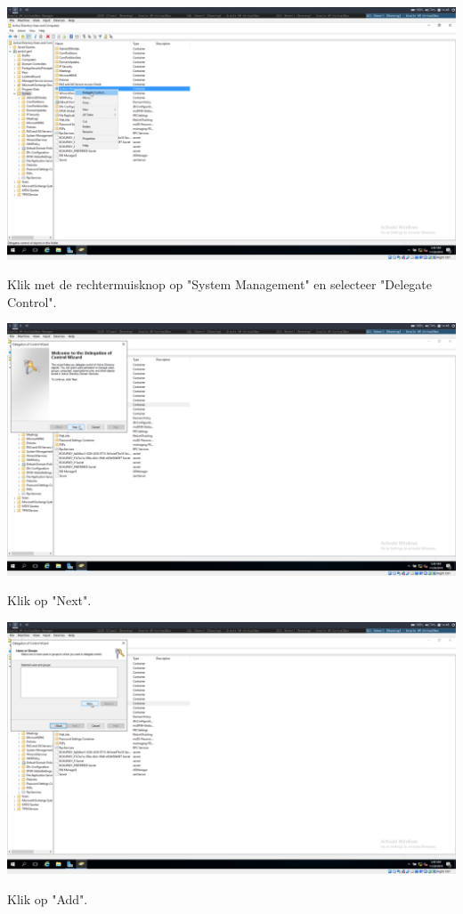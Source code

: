 \documentclass[a4paper]{article}
\begin{document}
\begin{center}
	\includegraphics[width=15cm]{Pictures/SCCM/1/1543499299.png}
	
	Klik met de rechtermuisknop op "System Management" en selecteer "Delegate Control".
\end{center}
\begin{center}
	\includegraphics[width=15cm]{Pictures/SCCM/1/1543499303.png}
	
	Klik op "Next".
\end{center}
\begin{center}
	\includegraphics[width=15cm]{Pictures/SCCM/1/1543499309.png}
	
	Klik op "Add".
\end{center}
\end{document}
